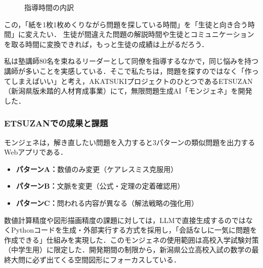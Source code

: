 \documentclass[paper=a4,fontsize=10.5bp,jafontsize=10.5bp,twocolumn]{jlreq}
\begin{document}
\begin{figure}[H]
  \centering
  \caption{指導時間の内訳}
  \label{fig:time_pie_alpha}
\end{figure}

この，「紙を1枚1枚めくりながら問題を探している時間」を「生徒と向き合う時間」に変えたい．
生徒が間違えた問題の解説時間や生徒とコミュニケーションを取る時間に変換できれば，もっと生徒の成績は上がるだろう．

私は塾講師80名を束ねるリーダーとして同僚を指導するなかで，同じ悩みを持つ講師が多いことを実感している．そこで私たちは，問題を探すのではなく「作ってしまえばいい」と考え，AKATSUKIプロジェクトのひとつであるETSUZAN（新潟県版未踏的人材育成事業）にて，無限問題生成AI「モンジェネ」を開発した．

\subsubsection{ETSUZANでの成果と課題}

モンジェネは，解き直したい問題を入力すると3パターンの類似問題を出力するWebアプリである．

\begin{itemize}
  \item \textbf{パターンA：}数値のみ変更（ケアレスミス克服用）
  \item \textbf{パターンB：}文脈を変更（公式・定理の定着確認用）
 \item \textbf{パターンC：}問われる内容が異なる（解法戦略の強化用）
\end{itemize}

数値計算精度や図形描画精度の課題に対しては，LLMで直接生成するのではなくPythonコードを生成・外部実行する方式を採用し，「会話なしに一気に問題を作成できる」仕組みを実現した．このモンジェネの使用範囲は高校入学試験対策（中学生用）に限定した．開発期間の制限から，新潟県公立高校入試の数学の最終大問に必ず出てくる空間図形にフォーカスしている．
\end{document}
